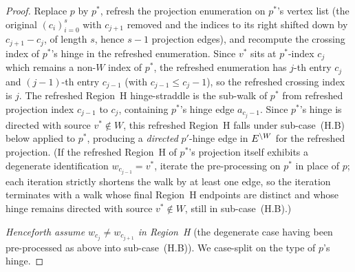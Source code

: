 \documentclass[main]{subfiles}
\begin{document}
\begin{proof}
Replace $p$ by $p^*$, refresh the projection enumeration on $p^*$'s
vertex list (the original $(c_i)_{i = 0}^{s}$ with $c_{j+1}$ removed and
the indices to its right shifted down by $c_{j+1} - c_j$, of length $s$,
hence $s - 1$ projection edges), and recompute the crossing index of
$p^*$'s hinge in the refreshed enumeration. Since $v^*$ sits at
$p^*$-index $c_j$ which remains a non-$W$ index of $p^*$, the refreshed
enumeration has $j$-th entry $c_j$ and $(j - 1)$-th entry $c_{j - 1}$
(with $c_{j - 1} \le c_j - 1$), so the refreshed crossing index is $j$.
The refreshed Region~H hinge-straddle is the sub-walk of $p^*$ from
refreshed projection index $c_{j - 1}$ to $c_j$, containing $p^*$'s hinge
edge $a_{c_j - 1}$. Since $p^*$'s hinge is directed with source
$v^* \notin W$, this refreshed Region~H falls under sub-case~(H.B) below
applied to $p^*$, producing a \emph{directed} $p'$-hinge edge in
$E^{\setminus W}$ for the refreshed projection. (If the refreshed Region~H of
$p^*$'s projection itself exhibits a degenerate identification
$w_{c_{j - 1}} = v^*$, iterate the pre-processing on $p^*$ in place of
$p$; each iteration strictly shortens the walk by at least one edge, so
the iteration terminates with a walk whose final Region~H endpoints are
distinct and whose hinge remains directed with source $v^* \notin W$,
still in sub-case~(H.B).)

\emph{Henceforth assume $w_{c_j} \ne w_{c_{j+1}}$ in Region~H} (the
degenerate case having been pre-processed as above into sub-case~(H.B)).
We case-split on the type of $p$'s hinge.


\end{proof}
\end{document}
